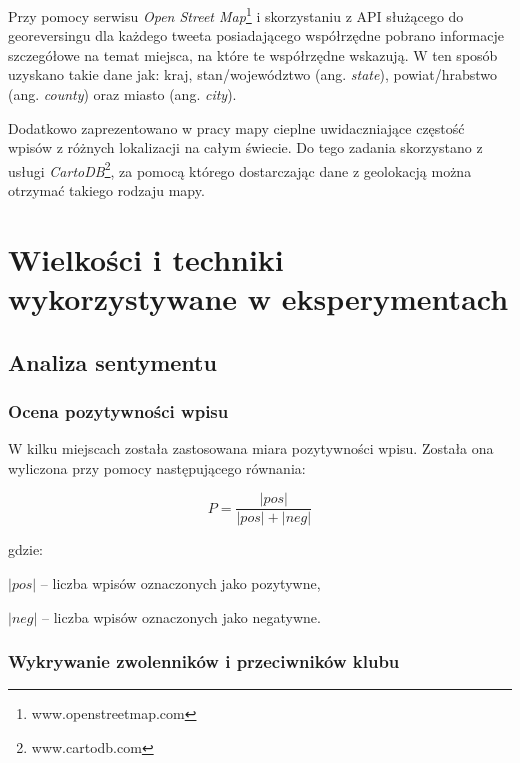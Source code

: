 Przy pomocy serwisu \textit{Open Street Map}\footnote{www.openstreetmap.com} i
skorzystaniu z API służącego do georeversingu dla każdego tweeta posiadającego
współrzędne pobrano informacje szczegółowe na temat miejsca, na które te
współrzędne wskazują. W ten sposób uzyskano takie dane jak: kraj,
stan/województwo (ang. \textit{state}), powiat/hrabstwo (ang. \textit{county})
oraz miasto (ang. \textit{city}).

Dodatkowo zaprezentowano w pracy mapy cieplne uwidaczniające częstość wpisów z
różnych lokalizacji na całym świecie. Do tego zadania skorzystano z usługi
\textit{CartoDB}\footnote{www.cartodb.com}, za pomocą którego dostarczając dane
z geolokacją można otrzymać takiego rodzaju mapy.




\section{Wielkości i techniki wykorzystywane w eksperymentach}
\label{section:wielkosciwykorzystywane}
\subsection{Analiza sentymentu}
\subsubsection{Ocena pozytywności wpisu}
\label{subsection:ocenapozytywnosci}
W kilku miejscach została zastosowana miara pozytywności wpisu.
Została ona wyliczona przy pomocy następującego równania:

\begin{equation}
\label{equation:pozytywnosc}
P = \frac{|pos|}{|pos| + |neg|}
\end{equation}

gdzie:

$|pos|$ -- liczba wpisów oznaczonych jako pozytywne,

$|neg|$ -- liczba wpisów oznaczonych jako negatywne.



\subsubsection{Wykrywanie zwolenników i przeciwników klubu}
\label{subsubsection:wykrywaniezwolennikow}

